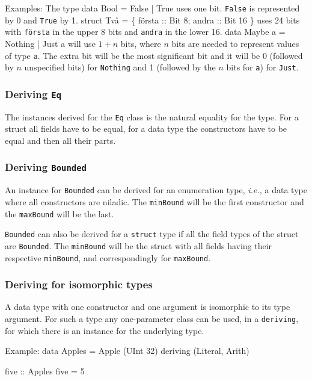 \documentclass[twoside,letterpaper]{article}
\newcommand{\ie}{\emph{i.e.,}}
\newcommand{\te}[1]{\texttt{#1}}
\begin{document}
Examples: The type
\BBS
data Bool = False | True
\EBS
uses one bit.  \te{False} is represented by 0 and \te{True} by 1.
\BBS
struct Två = \{ första :: Bit 8; andra :: Bit 16 \}
\EBS
uses 24 bits with \te{första} in the upper 8 bits and \te{andra} in the lower 16.
\BBS
data Maybe a = Nothing | Just a
\EBS
will use $1+n$ bits, where $n$ bits are needed to represent values of
type \te{a}.  The extra bit will be the most significant bit and it
will be 0 (followed by $n$ unspecified bits) for \te{Nothing} and 1
(followed by the $n$ bits for \te{a}) for \te{Just}.


\subsubsection{Deriving \te{Eq}}

The instances derived for the \te{Eq} class is the natural equality for
the type.  For a struct all fields have to be equal, for a data type the constructors
have to be equal and then all their parts.


\subsubsection{Deriving \te{Bounded}}

An instance for \te{Bounded} can be derived for an enumeration type,
{\ie} a data type where all constructors are niladic.  The \te{minBound} will
be the first constructor and the \te{maxBound} will be the last.

\te{Bounded} can also be derived for a \te{struct} type if all the field types of
the struct are \te{Bounded}.  The \te{minBound} will be the struct with all
fields having their respective \te{minBound}, and correspondingly for \te{maxBound}.

\subsubsection{Deriving for isomorphic types}

A data type with one constructor and one argument is isomorphic to its type
argument.  For such a type any one-parameter class can be used, in a {\te{deriving}},
for which there is an instance for the underlying type.

Example:
\BBS
data Apples = Apple (UInt 32) deriving (Literal, Arith)

five :: Apples
five = 5
\end{document}
